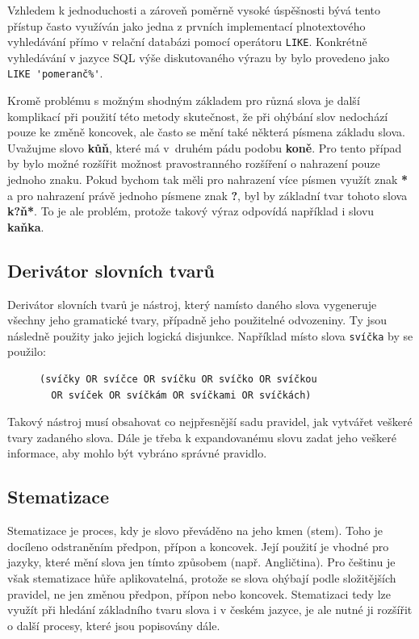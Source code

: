 \documentclass[FM,DP]{tulthesis}
\begin{document}
Vzhledem k jednoduchosti a zároveň poměrně vysoké úspěšnosti bývá tento přístup
často využíván jako jedna z prvních implementací plnotextového vyhledávání přímo
v relační databázi pomocí operátoru \verb|LIKE|. Konkrétně vyhledávání v jazyce SQL
výše diskutovaného výrazu by bylo provedeno jako \verb|LIKE 'pomeranč%'|.

Kromě problému s možným shodným základem pro různá slova je další komplikací při 
použití této metody skutečnost, že při ohýbání slov nedochází pouze ke změně koncovek, 
ale často se mění také některá písmena základu slova. Uvažujme slovo \textbf{kůň}, které
má v~druhém pádu podobu \textbf{koně}. Pro tento případ by bylo možné rozšířit možnost 
pravostranného rozšíření o nahrazení pouze jednoho znaku. Pokud bychom tak měli 
pro nahrazení více písmen využít znak \textbf{*} a pro nahrazení právě jednoho písmene 
znak \textbf{?}, byl by základní tvar tohoto slova \textbf{k?ň*}. To je ale problém, protože 
takový výraz odpovídá například i slovu \textbf{kaňka}.

\subsection{Derivátor slovních tvarů}

Derivátor slovních tvarů je nástroj, který namísto daného slova vygeneruje 
všechny jeho gramatické tvary, případně jeho použitelné odvozeniny. 
Ty jsou následně použity jako jejich logická disjunkce. Například místo 
slova \verb|svíčka| by se použilo:

\begin{figure}[thp]
\centering 
\begin{minipage}{0.73\textwidth}
\begin{verbatim}
(svíčky OR svíčce OR svíčku OR svíčko OR svíčkou 
  OR svíček OR svíčkám OR svíčkami OR svíčkách)
\end{verbatim}
\end{minipage}
\end{figure}

Takový nástroj musí obsahovat co nejpřesnější sadu pravidel, jak vytvářet
veškeré tvary zadaného slova. Dále je třeba k expandovanému slovu zadat
jeho veškeré informace, aby mohlo být vybráno správné pravidlo.

\subsection{Stematizace}

Stematizace je proces, kdy je slovo převáděno na jeho kmen (stem). Toho je docíleno
odstraněním předpon, přípon a koncovek. Její použití je vhodné pro jazyky, 
které mění slova jen tímto způsobem (např. Angličtina). Pro češtinu je však stematizace
hůře aplikovatelná, protože se slova ohýbají podle složitějších pravidel, ne jen
změnou předpon, přípon nebo koncovek. Stematizaci tedy lze využít při hledání základního
tvaru slova i v českém jazyce, je ale nutné ji rozšířit o další procesy, které jsou 
popisovány dále.
\end{document}
